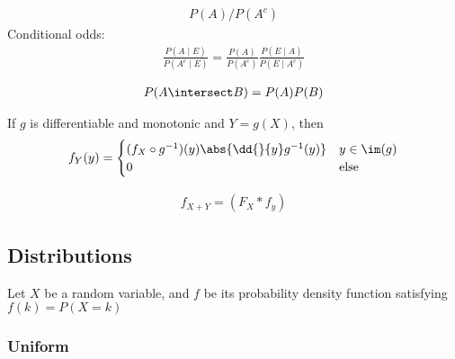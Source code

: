 \begin{definition}[Odds]

\begin{align*}
P(A) / P(A^c)
\end{align*} Conditional odds:
\begin{align*}
\frac{P(A \mid E)}{P(A^c \mid E)} = \frac{P(A)}{P(A^c)} \frac{P(E \mid A)}{P(E \mid A^c)}
\end{align*}

\end{definition}

\begin{definition}[Independence]

\begin{align*}
P(A \intersect B) = P(A) P(B)
\end{align*}

\end{definition}

\begin{proposition}

If \(g\) is differentiable and monotonic and \(Y=g(X)\), then
\begin{align*}
f_Y(y) = 
\begin{cases}
(f_X \circ g^{-1})(y) \abs{\dd{}{y} g^{-1}(y)} & y \in \im(g) \\
0 & \text{else} 
\end{cases}
\end{align*}

\end{proposition}

\begin{proposition}

\begin{align*}
f_{X+Y} = (F_X \ast f_y)
\end{align*}

\end{proposition}

\hypertarget{distributions}{%
\subsection{Distributions}\label{distributions}}

Let \(X\) be a random variable, and \(f\) be its probability density
function satisfying \(f(k) = P(X = k)\)

\hypertarget{uniform}{%
\subsubsection{Uniform}\label{uniform}}

